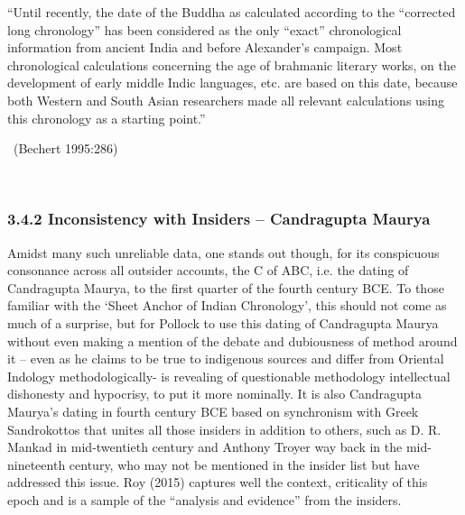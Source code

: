 \begin{myquote}
“Until recently, the date of the Buddha as calculated according to the “corrected long chronology” has been considered as the only “exact” chronological information from ancient India and before Alexander’s campaign. Most chronological calculations concerning the age of brahmanic literary works, on the development of early middle Indic languages, etc. are based on this date, because both Western and South Asian researchers made all relevant calculations using this chronology as a starting point.” 

~\hfill (Bechert 1995:286)
\end{myquote}

~
\vspace{-0.8cm}

\subsubsection*{3.4.2 Inconsistency with Insiders – Candragupta Maurya}

Amidst many such unreliable data, one stands out though, for its conspicuous consonance across all outsider accounts, the C of ABC, i.e. the dating of Candragupta Maurya, to the first quarter of the fourth century BCE. To those familiar with the ‘Sheet Anchor of Indian Chronology’, this should not come as much of a surprise, but for Pollock to use this dating of Candragupta Maurya without even making a mention of the debate and dubiousness of method around it – even as he claims to be true to indigenous sources and differ from Oriental Indology methodologically- is revealing of questionable methodology intellectual dishonesty and hypocrisy, to put it more nominally. It is also Candragupta Maurya’s dating in fourth century BCE based on synchronism with Greek Sandrokottos that unites all those insiders in addition to others, such as D. R. Mankad in mid-twentieth century and Anthony Troyer way back in the mid-nineteenth century, who may not be mentioned in the insider list but have addressed this issue. Roy (2015) captures well the context, criticality of this epoch and is a sample of the “analysis and evidence” from the insiders.

